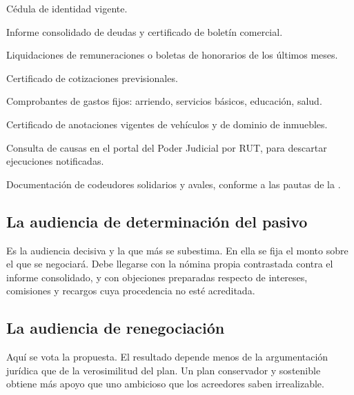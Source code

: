 \bloqueDocumental

\begin{checklist}
  \item Cédula de identidad vigente.
  \item Informe consolidado de deudas y certificado de boletín comercial.
  \item Liquidaciones de remuneraciones o boletas de honorarios de los últimos meses.
  \item Certificado de cotizaciones previsionales.
  \item Comprobantes de gastos fijos: arriendo, servicios básicos, educación, salud.
  \item Certificado de anotaciones vigentes de vehículos y de dominio de inmuebles.
  \item Consulta de causas en el portal del Poder Judicial por RUT, para descartar
  ejecuciones notificadas.
  \item Documentación de codeudores solidarios y avales, conforme a las pautas de la
   \citeyearpar{ncg-28}.
\end{checklist}

\bloqueFocos

\subsection{La audiencia de determinación del pasivo}

Es la audiencia decisiva y la que más se subestima. En ella se fija el monto sobre el que
se negociará. Debe llegarse con la nómina propia contrastada contra el informe
consolidado, y con objeciones preparadas respecto de intereses, comisiones y recargos
cuya procedencia no esté acreditada.

\subsection{La audiencia de renegociación}

Aquí se vota la propuesta. El resultado depende menos de la argumentación jurídica que de
la verosimilitud del plan. Un plan conservador y sostenible obtiene más apoyo que uno
ambicioso que los acreedores saben irrealizable.

